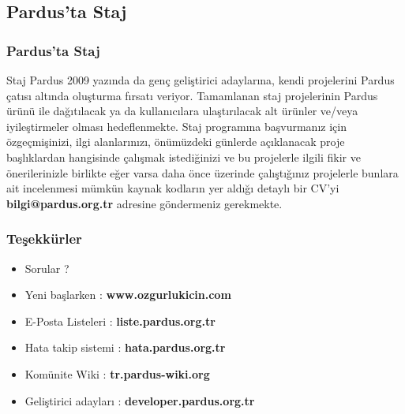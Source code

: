 \documentclass{beamer}
\begin{document}
\subsection{Pardus'ta Staj}
\frame
{
    \frametitle{Pardus'ta Staj}
    \begin{block}{Staj}
        Pardus 2009 yazında da genç geliştirici adaylarına, kendi projelerini Pardus çatısı altında oluşturma fırsatı veriyor. Tamamlanan staj projelerinin Pardus ürünü ile dağıtılacak ya da kullanıcılara ulaştırılacak alt ürünler ve/veya iyileştirmeler olması hedeflenmekte.
        Staj programına başvurmanız için özgeçmişinizi, ilgi alanlarınızı, önümüzdeki günlerde açıklanacak proje başlıklardan hangisinde çalışmak istediğinizi ve bu projelerle ilgili fikir ve önerilerinizle birlikte eğer varsa daha önce üzerinde çalıştığınız projelerle bunlara ait incelenmesi mümkün kaynak kodların yer aldığı detaylı bir CV'yi \textbf{bilgi@pardus.org.tr} adresine göndermeniz gerekmekte.
    \end{block}
}


\frame
{
	\frametitle{Teşekkürler}
	\begin{itemize}
        \item Sorular ?
	\end{itemize}

	\begin{itemize}
        \item Yeni başlarken : \textbf{www.ozgurlukicin.com}
        \item E-Posta Listeleri : \textbf{liste.pardus.org.tr}
        \item Hata takip sistemi : \textbf{hata.pardus.org.tr}
        \item Komünite Wiki : \textbf{tr.pardus-wiki.org}
        \item Geliştirici adayları : \textbf{developer.pardus.org.tr}
	\end{itemize}

}
\end{document}
